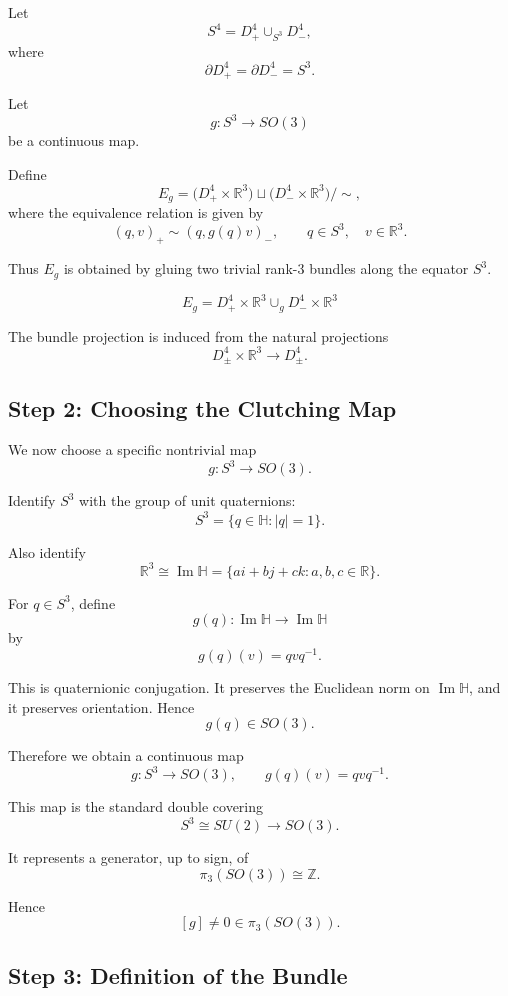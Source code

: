 \documentclass[12pt,a4paper]{article}
\theoremstyle{notespace}
\begin{document}
Let
\[
S^4 = D^4_+ \cup_{S^3} D^4_-,
\]
where
\[
\partial D^4_+ = \partial D^4_- = S^3.
\]

Let
\[
g:S^3\longrightarrow SO(3)
\]
be a continuous map.

Define
\[
E_g =
\bigl(D^4_+ \times \mathbb R^3\bigr)
\sqcup
\bigl(D^4_- \times \mathbb R^3\bigr)
/\sim,
\]
where the equivalence relation is given by
\[
(q,v)_+ \sim (q,g(q)v)_-,
\qquad
q\in S^3,\quad v\in \mathbb R^3.
\]

Thus \(E_g\) is obtained by gluing two trivial rank-\(3\) bundles along the equator \(S^3\).

\[
\boxed{
	E_g =
	D^4_+ \times \mathbb R^3
	\cup_g
	D^4_- \times \mathbb R^3
}
\]

The bundle projection is induced from the natural projections
\[
D^4_\pm \times \mathbb R^3 \longrightarrow D^4_\pm.
\]

\subsection{Step 2: Choosing the Clutching Map}

We now choose a specific nontrivial map
\[
g:S^3\longrightarrow SO(3).
\]

Identify \(S^3\) with the group of unit quaternions:
\[
S^3=\{q\in \mathbb H: |q|=1\}.
\]

Also identify
\[
\mathbb R^3
\cong
\operatorname{Im}\mathbb H
=
\{ai+bj+ck : a,b,c\in \mathbb R\}.
\]

For \(q\in S^3\), define
\[
g(q):\operatorname{Im}\mathbb H\longrightarrow \operatorname{Im}\mathbb H
\]
by
\[
g(q)(v)=qvq^{-1}.
\]

This is quaternionic conjugation. It preserves the Euclidean norm on
\(\operatorname{Im}\mathbb H\), and it preserves orientation. Hence
\[
g(q)\in SO(3).
\]

Therefore we obtain a continuous map
\[
g:S^3\longrightarrow SO(3),
\qquad
g(q)(v)=qvq^{-1}.
\]

This map is the standard double covering
\[
S^3\cong SU(2)\longrightarrow SO(3).
\]

It represents a generator, up to sign, of
\[
\pi_3(SO(3))\cong \mathbb Z.
\]

Hence
\[
[g]\neq 0\in \pi_3(SO(3)).
\]

\subsection{Step 3: Definition of the Bundle}
\end{document}
